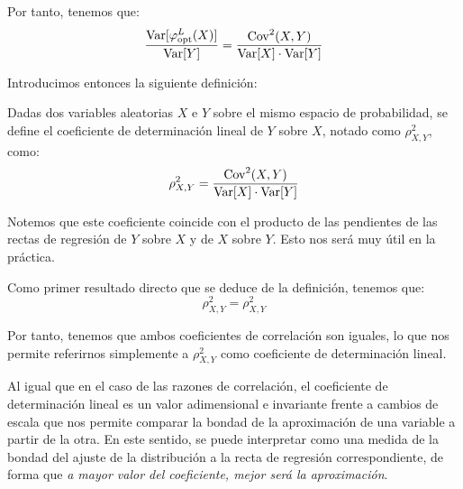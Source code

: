 Por tanto, tenemos que:
\begin{equation*}
    \dfrac{\operatorname{Var}[\varphi_{\text{opt}}^L(X)]}{\operatorname{Var}[Y]} = \dfrac{\operatorname{Cov}^2(X,Y)}{\operatorname{Var}[X]\cdot \operatorname{Var}[Y]}
\end{equation*}

Introducimos entonces la siguiente definición:
\begin{definicion}
    Dadas dos variables aleatorias $X$ e $Y$ sobre el mismo espacio de probabilidad, se define el coeficiente de determinación lineal de $Y$ sobre $X$, notado como $\rho^2_{X,Y}$, como:
    \begin{equation*}
        \rho^2_{X,Y} = \dfrac{\operatorname{Cov}^2(X,Y)}{\operatorname{Var}[X]\cdot \operatorname{Var}[Y]}
    \end{equation*}
\end{definicion}
\begin{observacion}
    Notemos que este coeficiente coincide con el producto de las pendientes de las rectas de regresión de $Y$ sobre $X$ y de $X$ sobre $Y$. Esto nos será muy útil en la práctica.
\end{observacion}

Como primer resultado directo que se deduce de la definición, tenemos que:
\begin{equation*}
    \rho^2_{X,Y} = \rho^2_{X,Y}
\end{equation*}

Por tanto, tenemos que ambos coeficientes de correlación son iguales, lo que nos permite referirnos simplemente a $\rho^2_{X,Y}$ como coeficiente de determinación lineal.

Al igual que en el caso de las razones de correlación, el coeficiente de determinación lineal es un valor adimensional e invariante frente a cambios de escala que nos permite comparar la bondad de la aproximación de una variable a partir de la otra. En este sentido, se puede interpretar como una medida de la bondad del ajuste de la distribución a la recta de regresión correspondiente, de forma que \emph{a mayor valor del coeficiente, mejor será la aproximación}.


